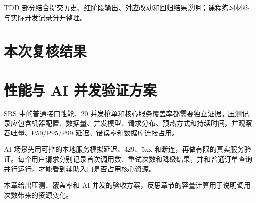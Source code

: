 TDD 部分结合提交历史、红阶段输出、对应改动和回归结果说明；课程练习材料与实际开发记录分开整理。
\section{本次复核结果}

\section{性能与 AI 并发验证方案}
SRS 中的普通接口性能、20 并发抢单和核心服务覆盖率都需要独立证据。压测记录应包含机器配置、数据量、并发模型、请求分布、预热方式和持续时间，并观察吞吐量、P50/P95/P99 延迟、错误率和数据库连接占用。

AI 场景先用可控的本地服务模拟延迟、429、5xx 和断连，再做有限的真实服务验证。每个用户请求分别记录首次调用数、重试次数和降级结果，并和普通订单查询并行运行，才能看到辅助入口是否占用核心资源。

本章给出压测、覆盖率和 AI 并发的验收方案，反思章节的容量计算用于说明调用次数带来的资源变化。
